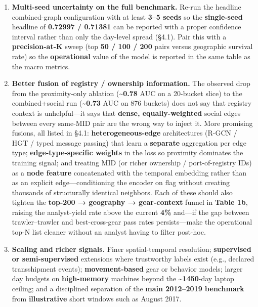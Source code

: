 \documentclass[
]{article}
\providecommand{\tightlist}{%
  \setlength{\itemsep}{0pt}\setlength{\parskip}{0pt}}
\begin{document}
\begin{enumerate}
\def\labelenumi{\arabic{enumi}.}
\tightlist
\item
  \textbf{Multi-seed uncertainty on the full benchmark.} Re-run the
  headline combined-graph configuration with at least \textbf{3--5
  seeds} so the \textbf{single-seed} headline of \textbf{0.72997 /
  0.71381} can be reported with a proper confidence interval rather than
  only the day-level spread (§4.1). Pair this with a
  \textbf{precision-at-K} sweep (top \textbf{50 / 100 / 200} pairs
  versus geographic survival rate) so the \textbf{operational} value of
  the model is reported in the same table as the macro metrics.
\item
  \textbf{Better fusion of registry / ownership information.} The
  observed drop from the proximity-only ablation
  (\textasciitilde{}\textbf{0.78} AUC on a 20-bucket slice) to the
  combined+social run (\textasciitilde{}\textbf{0.73} AUC on 876
  buckets) does not say that registry context is unhelpful---it says
  that \textbf{dense, equally-weighted} social edges between every
  same-MID pair are the wrong way to inject it. More promising fusions,
  all listed in §4.1: \textbf{heterogeneous-edge} architectures (R-GCN /
  HGT / typed message passing) that learn a \textbf{separate}
  aggregation per edge type; \textbf{edge-type-specific weights} in the
  loss so proximity dominates the training signal; and treating MID (or
  richer ownership / port-of-registry IDs) as a \textbf{node feature}
  concatenated with the temporal embedding rather than as an explicit
  edge---conditioning the encoder on flag without creating thousands of
  structurally identical neighbors. Each of these should also tighten
  the \textbf{top-200 → geography → gear-context} funnel in
  \textbf{Table 1b}, raising the analyst-yield rate above the current
  \textbf{4\%} and---if the gap between trawler--trawler and
  best-cross-gear pass rates persists---make the operational top-N list
  cleaner without an analyst having to filter post-hoc.
\item
  \textbf{Scaling and richer signals.} Finer spatial-temporal
  resolution; \textbf{supervised or semi-supervised} extensions where
  trustworthy labels exist (e.g., declared transshipment events);
  \textbf{movement-based} gear or behavior models; larger day budgets on
  \textbf{high-memory} machines beyond the
  \textbf{\textasciitilde1450}-day laptop ceiling; and a disciplined
  separation of the \textbf{main 2012--2019 benchmark} from
  \textbf{illustrative} short windows such as August 2017.
\end{enumerate}
\end{document}
